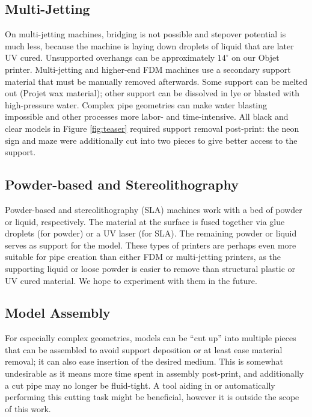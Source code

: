 \subsection{Multi-Jetting}
On multi-jetting machines, bridging is not possible and stepover potential is much less, because the machine is laying down droplets of liquid that are later UV cured.  Unsupported overhangs can be approximately $14^{\circ}$ on our Objet printer.  Multi-jetting and higher-end FDM machines use a secondary support material that must be manually removed afterwards. Some support can be melted out (Projet wax material); other support can be dissolved in lye or blasted with high-pressure water. Complex pipe geometries can make water blasting impossible and other processes more labor- and time-intensive.  All black and clear models in Figure \ref{fig:teaser} required support removal post-print: the neon sign and maze were additionally cut into two pieces to give better access to the support.

\subsection{Powder-based and Stereolithography}
Powder-based and stereolithography (SLA) machines work with a bed of powder or liquid, respectively.  The material at the surface is fused together via glue droplets (for powder) or a UV laser (for SLA).  The remaining powder or liquid serves as support for the model.  These types of printers are perhaps even more suitable for pipe creation than either FDM or multi-jetting printers, as the supporting liquid or loose powder is easier to remove than structural plastic or UV cured material.  We hope to experiment with them in the future.

\subsection{Model Assembly}
For especially complex geometries, models can be ``cut up'' into multiple pieces that can be assembled to avoid support deposition or at least ease material removal; it can also ease insertion of the desired medium. This is somewhat undesirable as it means more time spent in assembly post-print, and additionally a cut pipe may no longer be fluid-tight.  A tool aiding in or automatically performing this cutting task might be beneficial, however it is outside the scope of this work.